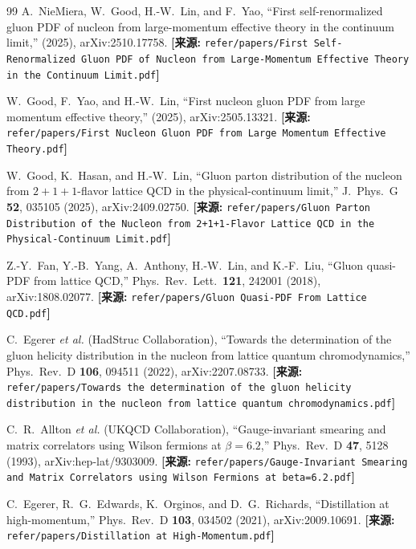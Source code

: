 \documentclass[12pt,a4paper]{ctexart}
\theoremstyle{definition}
\begin{document}
\begin{thebibliography}{99}
A.~NieMiera, W.~Good, H.-W.~Lin, and F.~Yao,
``First self-renormalized gluon PDF of nucleon from large-momentum effective theory in the continuum limit,''
(2025), arXiv:2510.17758.
\quad\textbf{[来源:} \texttt{refer/papers/First Self-Renormalized Gluon PDF of Nucleon from Large-Momentum Effective Theory in the Continuum Limit.pdf}\textbf{]}

W.~Good, F.~Yao, and H.-W.~Lin,
``First nucleon gluon PDF from large momentum effective theory,''
(2025), arXiv:2505.13321.
\quad\textbf{[来源:} \texttt{refer/papers/First Nucleon Gluon PDF from Large Momentum Effective Theory.pdf}\textbf{]}

W.~Good, K.~Hasan, and H.-W.~Lin,
``Gluon parton distribution of the nucleon from $2+1+1$-flavor lattice QCD in the physical-continuum limit,''
J.\ Phys.\ G \textbf{52}, 035105 (2025), arXiv:2409.02750.
\quad\textbf{[来源:} \texttt{refer/papers/Gluon Parton Distribution of the Nucleon from 2+1+1-Flavor Lattice QCD in the Physical-Continuum Limit.pdf}\textbf{]}

Z.-Y.~Fan, Y.-B.~Yang, A.~Anthony, H.-W.~Lin, and K.-F.~Liu,
``Gluon quasi-PDF from lattice QCD,''
Phys.\ Rev.\ Lett.\ \textbf{121}, 242001 (2018), arXiv:1808.02077.
\quad\textbf{[来源:} \texttt{refer/papers/Gluon Quasi-PDF From Lattice QCD.pdf}\textbf{]}


C.~Egerer \textit{et al.} (HadStruc Collaboration),
``Towards the determination of the gluon helicity distribution in the nucleon from lattice quantum chromodynamics,''
Phys.\ Rev.\ D \textbf{106}, 094511 (2022), arXiv:2207.08733.
\quad\textbf{[来源:} \texttt{refer/papers/Towards the determination of the gluon helicity distribution in the nucleon from lattice quantum chromodynamics.pdf}\textbf{]}


C.~R.~Allton \textit{et al.} (UKQCD Collaboration),
``Gauge-invariant smearing and matrix correlators using Wilson fermions at $\beta=6.2$,''
Phys.\ Rev.\ D \textbf{47}, 5128 (1993), arXiv:hep-lat/9303009.
\quad\textbf{[来源:} \texttt{refer/papers/Gauge-Invariant Smearing and Matrix Correlators using Wilson Fermions at beta=6.2.pdf}\textbf{]}

C.~Egerer, R.~G.~Edwards, K.~Orginos, and D.~G.~Richards,
``Distillation at high-momentum,''
Phys.\ Rev.\ D \textbf{103}, 034502 (2021), arXiv:2009.10691.
\quad\textbf{[来源:} \texttt{refer/papers/Distillation at High-Momentum.pdf}\textbf{]}


\end{thebibliography}
\end{document}
